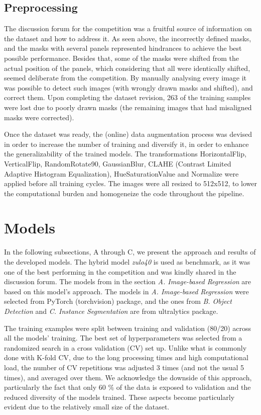 \documentclass[conference]{IEEEtran}
\begin{document}
\subsection{Preprocessing}

The discussion forum for the competition was a fruitful source of information on the dataset and how to address it. As seen above, the incorrectly defined masks, and the masks with several panels represented hindrances to achieve the best possible performance. Besides that, some of the masks were shifted from the actual position of the panels, which considering that all were identically shifted, seemed deliberate from the competition. By manually analysing every image  it was possible to detect such images (with wrongly drawn masks and shifted), and correct them. Upon completing the dataset revision, 263 of the training samples were lost due to poorly drawn masks (the remaining images that had misaligned masks were corrected).

Once the dataset was ready, the (online) data augmentation process was devised in order to increase the number of training and diversify it, in order to enhance the generalizability of the trained models. The transformations HorizontalFlip, VerticalFlip, RandomRotate90, GaussianBlur, CLAHE (Contrast Limited Adaptive Histogram Equalization), HueSaturationValue and Normalize were applied before all training cycles. The images were all resized to 512x512, to lower the computational burden and homogeneize the code throughout the pipeline. 

\section{Models}

In the following subsections, A through C, we present the approach and results of the developed models. The hybrid model \textit{zulo40} is used as benchmark, as it was one of the best performing in the competition and was kindly shared in the discussion forum. The models from in the section \textit{A. Image-based Regression} are based on this model's approach. The models in \textit{A. Image-based Regression} were selected from PyTorch (torchvision) package, and the ones from \textit{B. Object Detection} and \textit{C. Instance Segmentation} are from ultralytics package.

The training examples were split between training and validation (80/20) across all the models' training. The best set of hyperparameters was selected from a randomized search in a cross validation (CV) set up. Unlike what is commonly done with K-fold CV, due to the long processing times and high computational load, the number of CV repetitions was adjusted 3 times (and not the usual 5 times), and averaged over them. We acknowledge the downside of this approach, particularly the fact that only 60 \% of the data is exposed to validation and the reduced diversity of the models trained. These aspects become particularly evident due to the relatively small size of the dataset.
\end{document}
